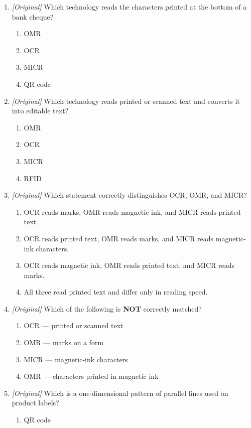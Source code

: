 \begin{enumerate}[label=\textbf{Q\arabic*.}, leftmargin=*]
\item \textit{[Original]} Which technology reads the characters printed at
  the bottom of a bank cheque?
  \begin{enumerate}[label=\Alph*.]
    \item OMR
    \item OCR
    \item MICR
    \item QR code
  \end{enumerate}
\item \textit{[Original]} Which technology reads printed or scanned text and
  converts it into editable text?
  \begin{enumerate}[label=\Alph*.]
    \item OMR
    \item OCR
    \item MICR
    \item RFID
  \end{enumerate}
\item \textit{[Original]} Which statement correctly distinguishes OCR, OMR,
  and MICR?
  \begin{enumerate}[label=\Alph*.]
    \item OCR reads marks, OMR reads magnetic ink, and MICR reads printed
      text.
    \item OCR reads printed text, OMR reads marks, and MICR reads
      magnetic-ink characters.
    \item OCR reads magnetic ink, OMR reads printed text, and MICR reads
      marks.
    \item All three read printed text and differ only in reading speed.
  \end{enumerate}
\item \textit{[Original]} Which of the following is \textbf{NOT} correctly
  matched?
  \begin{enumerate}[label=\Alph*.]
    \item OCR --- printed or scanned text
    \item OMR --- marks on a form
    \item MICR --- magnetic-ink characters
    \item OMR --- characters printed in magnetic ink
  \end{enumerate}
\item \textit{[Original]} Which is a one-dimensional pattern of parallel
  lines used on product labels?
  \begin{enumerate}[label=\Alph*.]
    \item QR code

\end{enumerate}
\end{enumerate}
